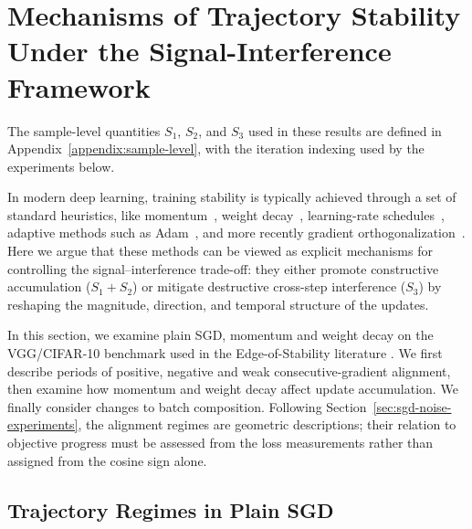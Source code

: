 \section{Mechanisms of Trajectory Stability Under the Signal-Interference Framework}

The sample-level quantities $S_1$, $S_2$, and $S_3$ used in these results are defined in Appendix~\ref{appendix:sample-level}, with the iteration indexing used by the experiments below.

In modern deep learning, training stability is typically achieved through a set of standard heuristics, like momentum~\cite{polyak1964methods,smith2018disciplined}, weight decay~\cite{krogh1991simple,loshchilov2017decoupled}, learning-rate schedules~\cite{smith2017cyclical,loshchilov2016sgdr}, adaptive methods such as Adam~\cite{kingma2014adam}, and more recently gradient orthogonalization~\cite{jordan2024muon}. Here we argue that these methods can be viewed as explicit mechanisms for controlling the signal--interference trade-off: they either promote constructive accumulation ($S_1+S_2$) or mitigate destructive cross-step interference ($S_3$) by reshaping the magnitude, direction, and temporal structure of the updates.

In this section, we examine plain SGD, momentum and weight decay on the
VGG/CIFAR-10 benchmark used in the Edge-of-Stability literature
\cite{cohen2021edge,simonyan2014vgg,krizhevsky2009cifar}. We first describe
periods of positive, negative and weak consecutive-gradient alignment, then
examine how momentum and weight decay affect update accumulation. We finally
consider changes to batch composition. Following
Section~\ref{sec:sgd-noise-experiments}, the alignment regimes are geometric
descriptions; their relation to objective progress must be assessed from the
loss measurements rather than assigned from the cosine sign alone.

\subsection{Trajectory Regimes in Plain SGD}

